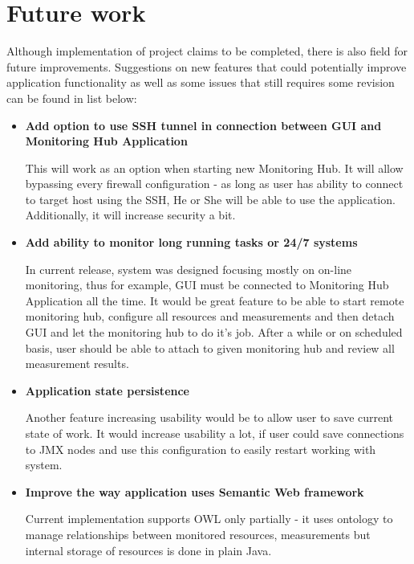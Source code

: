 %


\section{Future work}
\label{sec:ch8_future_work}
 
Although implementation of project claims to be completed, there is also field for future improvements. Suggestions on new features that could potentially improve application functionality as well as some issues that still requires some revision can be found in list below:

\begin{itemize}
 \item {\bf Add option to use SSH tunnel in connection between GUI and Monitoring Hub Application}
 
 This will work as an option when starting new Monitoring Hub. It will allow bypassing every firewall configuration - as long as user has ability to connect to target host using the SSH, He or She will be able to use the application. Additionally, it will increase security a bit.
 
\item {\bf Add ability to monitor long running tasks or 24/7 systems }  

In current release, system was designed focusing mostly on on-line monitoring, thus for example, GUI must be connected to Monitoring Hub Application all the time. It would be great feature to be able to start remote monitoring hub, configure all resources and measurements and then detach GUI and let the monitoring hub to do it\rq{}s job. After a while or on scheduled basis, user should be able to attach to given monitoring hub and review all measurement results.

\item {\bf Application state persistence }  

Another feature increasing usability would be to allow user to save current state of work. It would increase usability a lot, if user could save connections to JMX nodes and use this configuration to easily restart working with system. 

 \item {\bf Improve the way application uses Semantic Web framework} 
     
Current implementation supports OWL only partially - it uses ontology to manage relationships between monitored resources, measurements but internal storage of resources is done in plain Java.
     
   
\end{itemize}